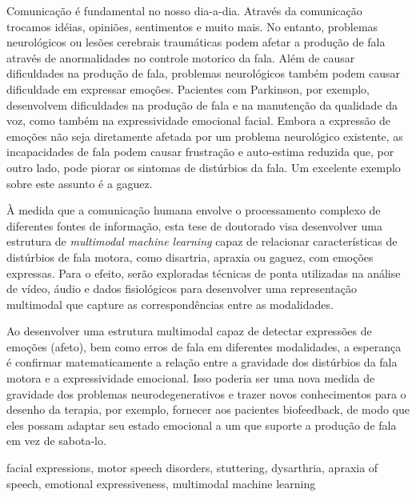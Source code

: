 Comunicação é fundamental no nosso dia-a-dia. Através da comunicação trocamos idéias, opiniões, sentimentos e muito mais.
No entanto, problemas neurológicos ou lesões cerebrais traumáticas podem afetar a produção de fala através de anormalidades no controle motorico da fala.
Além de causar dificuldades na produção de fala, problemas neurológicos também podem causar dificuldade em expressar emoções. Pacientes com Parkinson, por exemplo, desenvolvem dificuldades na produção de fala e na manutenção da qualidade da voz, como também na expressividade emocional facial.
Embora a expressão de emoções não seja diretamente afetada por um problema neurológico existente, as incapacidades de fala podem causar
frustração e auto-estima reduzida que, por outro lado, pode piorar os sintomas de distúrbios da fala. Um excelente exemplo sobre este assunto é a gaguez.


À medida que a comunicação humana envolve o processamento complexo de diferentes fontes de informação, esta tese de doutorado visa desenvolver uma estrutura de \textit{multimodal machine learning} capaz de relacionar características de distúrbios de fala motora, como disartria, apraxia ou  gaguez, com emoções expressas. Para o efeito, serão exploradas técnicas de ponta utilizadas na análise de vídeo, áudio e dados fisiológicos para desenvolver uma representação multimodal que capture as correspondências entre as modalidades.


Ao desenvolver uma estrutura multimodal capaz de detectar expressões de emoções (afeto), bem como erros de fala em diferentes modalidades, a esperança é confirmar matematicamente a relação entre a gravidade dos distúrbios da fala motora e a expressividade emocional. Isso poderia ser uma nova medida de gravidade dos problemas neurodegenerativos e trazer novos conhecimentos para o desenho da terapia, por exemplo, fornecer aos pacientes biofeedback, de modo que eles possam adaptar seu estado emocional a um que suporte a produção de fala em vez de
sabota-lo.


\begin{keywords}
facial expressions, motor speech disorders, stuttering, dysarthria, apraxia of speech, emotional expressiveness, multimodal machine learning 
\end{keywords} 


